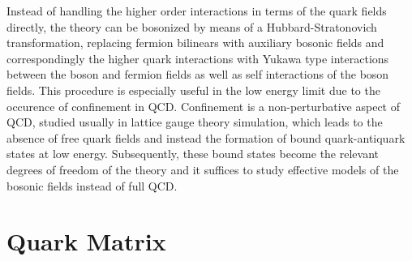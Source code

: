 Instead of handling the higher order interactions in terms of the quark fields directly, the theory can be bosonized by means of a Hubbard-Stratonovich transformation, replacing fermion bilinears with auxiliary bosonic fields and correspondingly the higher quark interactions with Yukawa type interactions between the boson and fermion fields as well as self interactions of the boson fields. This procedure is especially useful in the low energy limit due to the occurence of confinement in QCD. Confinement is a non-perturbative aspect of QCD, studied usually in lattice gauge theory simulation, which leads to the absence of free quark fields and instead the formation of bound quark-antiquark states at low energy. Subsequently, these bound states become the relevant degrees of freedom of the theory and it suffices to study effective models of the bosonic fields instead of full QCD. 

\section{Quark Matrix}

